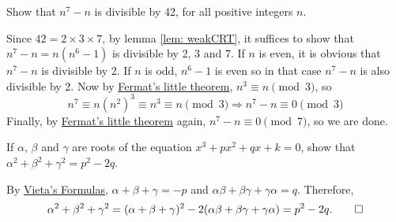 \begin{question}
    Show that $n^7 - n$ is divisible by 42, for all positive integers $n$.
\end{question}
\begin{solution}
    Since $42 = 2 \times 3 \times 7$, by lemma \ref{lem: weakCRT}, it suffices
    to show that $n^7 - n = n(n^6 - 1)$ is divisible by 2, 3 and 7. If $n$ is
    even, it is obvious that $n^7 - n$ is divisible by 2. If $n$ is odd, $n^6 -
    1$ is even so in that case $n^7 - n$ is also divisible by 2. Now by
    \hyperref[thm: FLT]{Fermat's little theorem}, $n^3 \equiv n \pmod{3}$, so
    \[ n^7 \equiv n(n^2)^3 \equiv n^3 \equiv n \pmod{3} \Longrightarrow n^7 - n
    \equiv 0 \pmod{3}\]
    Finally, by \hyperref[thm: FLT]{Fermat's little theorem} again, $n^7 - n
    \equiv 0 \pmod{7}$, so we are done.
\end{solution}

\begin{question}
    If $\alpha$, $\beta$ and $\gamma$ are roots of the equation $x^3 + px^2 +
    qx + k = 0$, show that $\alpha^2 + \beta^2 + \gamma^2 = p^2 - 2q$.
\end{question}
\begin{solution}
    By \hyperref[thm: vieta]{Vieta's Formulas}, $\alpha + \beta + \gamma = -p$
    and $\alpha \beta + \beta \gamma + \gamma \alpha = q$. Therefore,
    \[ \alpha^2 + \beta^2 + \gamma^2 = (\alpha + \beta + \gamma)^2 - 2(\alpha
    \beta + \beta \gamma + \gamma \alpha) = p^2 - 2q. \qedhere\]
\end{solution}
